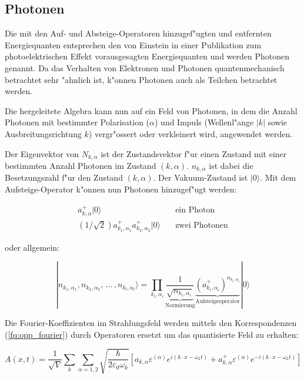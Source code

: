 \subsection{Photonen}

Die mit den Auf- und Absteige-Operatoren hinzugef"ugten und entfernten Energiequanten entsprechen den von Einstein in einer Publikation zum photoelektrischen Effekt vorausgesagten Energiequanten und werden Photonen genannt. Da das Verhalten von Elektronen und Photonen quantenmechanisch betrachtet sehr "ahnlich ist, k"onnen Photonen auch als Teilchen betrachtet werden.

Die hergeleitete Algebra kann nun auf ein Feld von Photonen, in dem die Anzahl Photonen mit bestimmter Polarisation ($\alpha$) und Impuls (Wellenl"ange $|k|$ sowie Ausbreitungsrichtung $k$) vergr"ossert oder verkleinert wird, angewendet werden.

Der Eigenvektor von $N_{k,\alpha}$ ist der Zustandsvektor f"ur einen Zustand mit einer bestimmten Anzahl Photonen im Zustand $(k,\alpha)$. $n_{k,\alpha}$ ist dabei die Besetzungszahl f"ur den Zustand $(k,\alpha)$. Der Vakuum-Zustand ist $|0\rangle$. Mit dem Aufsteige-Operator k"onnen nun Photonen hinzugef"ugt werden:

\begin{align*}
a^+_{k,\alpha}|0\rangle & \quad \text{ein Photon}\\
\left(1/\sqrt{2}\right)a^+_{k_1,\alpha_1}a^+_{k_2,\alpha_2}|0\rangle & \quad \text{zwei Photonen}
\end{align*}

oder allgemein:

\begin{equation*}
|n_{k_1,\alpha_1}, n_{k_2,\alpha_2}, \, \hdots \, , n_{k_l,\alpha_l}\rangle =
 \prod_{k_i,\alpha_i}\underbrace{\frac{1}{\sqrt{n_{k_i,\alpha_i}}}}_{\text{Normierung}} \underbrace{\left(a^+_{k_i,\alpha_i}\right)^{n_{k_i,\alpha_i}}}_{\text{Aufsteigeoperator}} |0\rangle
\end{equation*}

Die Fourier-Koeffizienten im Strahlungsfeld werden mittels den Korrespondenzen (\ref{fq:opp_fourier}) durch Operatoren ersetzt um das quantisierte Feld zu erhalten:

\begin{equation*}
A(x,t) = \frac{1}{\sqrt{V}} \sum_k \sum_{\alpha=1,2} \sqrt{\frac{\hbar}{2 \varepsilon_0 \omega_k}} \left[a_{k,\alpha} \varepsilon^{(\alpha)} e^{i (k \cdot x - \omega_k t)} + a^+_{k,\alpha} \varepsilon^{(\alpha)} e^{-i (k \cdot x - \omega_k t)}\right]
\end{equation*}

